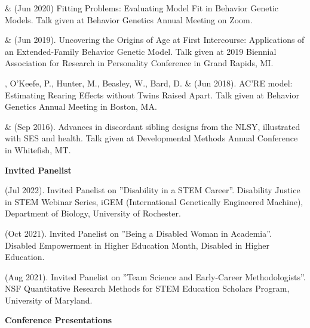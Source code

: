\begin{etaremune}
\item \meb \& \Joe (Jun 2020) Fitting Problems: Evaluating Model Fit in Behavior Genetic Models. Talk given at Behavior Genetics Annual Meeting on Zoom.
%
\item \meb \& \Joe (Jun 2019). Uncovering the Origins of Age at First Intercourse: Applications of an Extended-Family Behavior Genetic Model. Talk given at 2019 Biennial Association for Research in Personality Conference in Grand Rapids, MI.
%
\item\meb, O'Keefe, P., Hunter, M., Beasley, W., Bard, D. \& \Joe (Jun 2018). AC'RE model: Estimating Rearing Effects without Twins Raised Apart. Talk given at Behavior Genetics Annual Meeting in Boston, MA.
%
\item\meb \& \joe (Sep 2016). Advances in discordant sibling designs from the NLSY, illustrated with SES and health. Talk given at Developmental Methods Annual Conference in Whitefish, MT.%
%
\end{etaremune}
{\large \bf Invited Panelist}
\begin{etaremune}

\item \meb (Jul 2022). Invited Panelist on ''Disability in a STEM Career''. Disability Justice in STEM Webinar Series, iGEM (International Genetically Engineered Machine), Department of Biology, University of Rochester.
%
\item \meb (Oct 2021). Invited Panelist on ''Being a Disabled Woman in Academia''. Disabled Empowerment in Higher Education Month, Disabled in Higher Education.
%
\item \meb (Aug 2021). Invited Panelist on ''Team Science and Early-Career Methodologists''. NSF Quantitative Research Methods for STEM Education Scholars Program, University of Maryland.%
\end{etaremune}
{\large {\bf Conference Presentations}}
